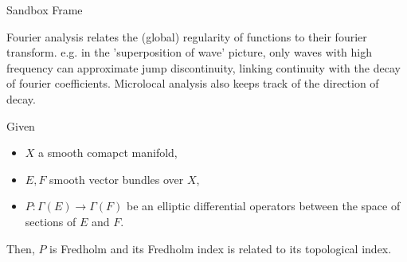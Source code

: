 \documentclass{beamer}
\begin{document}
\begin{frame}{Sandbox Frame}


Fourier analysis relates the (global) regularity of functions to their fourier transform. e.g. in the 'superposition of wave' picture, only waves with high frequency can approximate jump discontinuity, linking continuity with the decay of fourier coefficients. 
Microlocal analysis also keeps track of the direction of decay. 


\begin{theorem}
    Given
    \begin{itemize}
        \item $X$ a smooth comapct manifold, 
        \item $E, F$ smooth vector bundles over $X$, 
        \item $P : \Gamma(E) \to \Gamma(F)$ be an elliptic differential operators between the space of sections of $E$ and $F$. 
    \end{itemize}
    Then, $P$ is Fredholm and its Fredholm index is related to its topological index. 
\end{theorem}
\end{frame}
\end{document}
